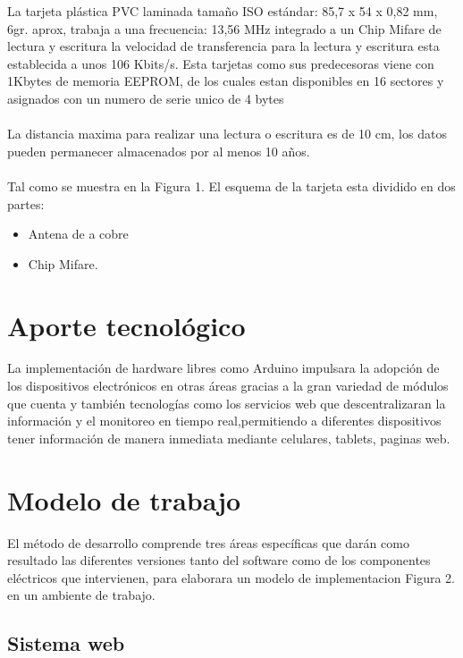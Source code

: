\documentclass[11pt,twocolumn]{article}
\begin{document}
La tarjeta plástica PVC laminada tamaño ISO estándar: 85,7 x 54 x 0,82 mm, 6gr. aprox, trabaja a una frecuencia: 13,56 MHz integrado a un Chip Mifare de lectura y escritura la velocidad de transferencia para la lectura y escritura esta establecida a unos 106 Kbits/s. Esta tarjetas como sus predecesoras viene  con 1Kbytes de memoria EEPROM, de los cuales estan disponibles en 16 sectores y asignados con un numero de serie unico de 4 bytes\\
\\
La distancia maxima para realizar una lectura o escritura es de 10 cm, los datos pueden permanecer almacenados por al menos 10 a\~nos. \\
\\
Tal como se muestra en la Figura 1. El esquema de la tarjeta esta dividido en dos partes:\\

\begin{itemize}
	\item Antena de a cobre
	\item Chip Mifare.
\end{itemize}

\section{Aporte tecnol\'ogico}

La implementaci\'on de hardware libres como Arduino impulsara la adopci\'on de los dispositivos electr\'onicos en otras \'areas gracias a la gran variedad de m\'odulos que cuenta y tambi\'en tecnolog\'ias como los servicios web que descentralizaran la informaci\'on y el monitoreo en tiempo real,permitiendo a diferentes dispositivos tener informaci\'on de manera inmediata mediante   celulares, tablets, paginas web.\\

\section{Modelo de trabajo}  

El m\'etodo de desarrollo comprende tres \'areas espec\'ificas que dar\'an como resultado las diferentes versiones tanto del software como de los componentes el\'ectricos  que intervienen, para elaborara un modelo de implementacion Figura 2. en un ambiente de trabajo.\\

	\subsection{ Sistema web }
	
\end{document}
